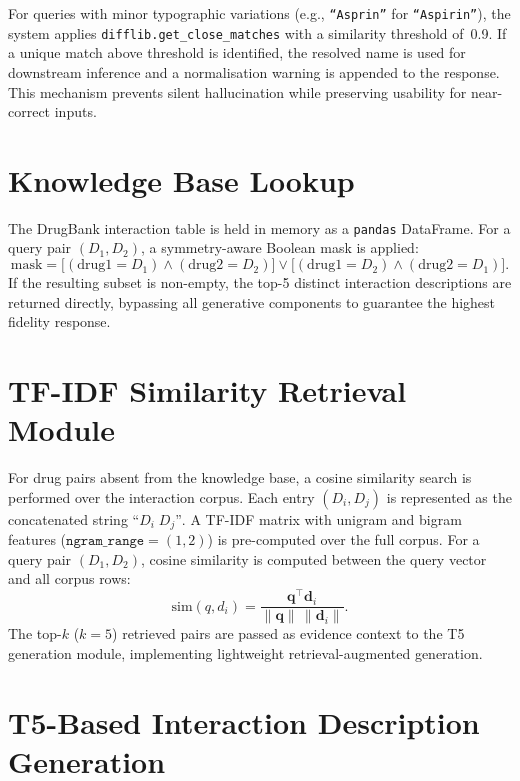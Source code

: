 \documentclass[12pt,a4paper,oneside]{report}
\begin{document}
For queries with minor typographic variations (e.g., \texttt{``Asprin''} for
\texttt{``Aspirin''}), the system applies \texttt{difflib.get\_close\_matches} with a
similarity threshold of~0.9. If a unique match above threshold is identified, the resolved
name is used for downstream inference and a normalisation warning is appended to the
response. This mechanism prevents silent hallucination while preserving usability for
near-correct inputs.

\section{Knowledge Base Lookup}

The DrugBank interaction table is held in memory as a \texttt{pandas} DataFrame. For a query
pair $(D_1, D_2)$, a symmetry-aware Boolean mask is applied:
\begin{equation}
  \mathrm{mask} =
    \bigl[(\text{drug1} = D_1) \wedge (\text{drug2} = D_2)\bigr]
    \vee
    \bigl[(\text{drug1} = D_2) \wedge (\text{drug2} = D_1)\bigr].
  \label{eq:kb_mask}
\end{equation}
If the resulting subset is non-empty, the top-5 distinct interaction descriptions are
returned directly, bypassing all generative components to guarantee the highest fidelity
response.

\section{TF-IDF Similarity Retrieval Module}

For drug pairs absent from the knowledge base, a cosine similarity search is performed over
the interaction corpus. Each entry $(D_i, D_j)$ is represented as the concatenated string
$\texttt{``}D_i\;\!D_j\texttt{''}$. A TF-IDF matrix with unigram and bigram features
($\texttt{ngram\_range}=(1,2)$) is pre-computed over the full corpus. For a query pair
$(D_1, D_2)$, cosine similarity is computed between the query vector and all corpus rows:
\begin{equation}
  \mathrm{sim}(q, d_i) = \frac{\mathbf{q}^\top \mathbf{d}_i}{\|\mathbf{q}\|\,\|\mathbf{d}_i\|}.
  \label{eq:cosine}
\end{equation}
The top-$k$ ($k=5$) retrieved pairs are passed as evidence context to the T5 generation
module, implementing lightweight retrieval-augmented generation.

\section{T5-Based Interaction Description Generation}
\end{document}
